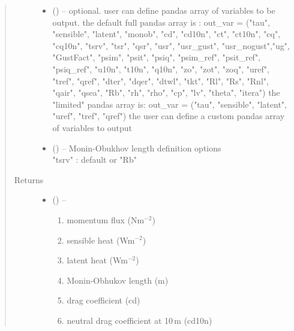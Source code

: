 \documentclass[letterpaper,10pt,english]{sphinxmanual}
\begin{document}
\begin{fulllineitems}
\begin{quote}
\begin{description}
\begin{itemize}
\item {} 
 (\href{https://docs.python.org/3/library/functions.html\#int}{}) -- optional. user can define pandas array of variables to be output.
           the default full pandas array is :
               out\_var = ("tau", "sensible", "latent", "monob", "cd", "cd10n",
                                 "ct", "ct10n", "cq", "cq10n", "tsrv", "tsr", "qsr",
                                 "usr", "usr\_gust", "usr\_nogust","ug", "GustFact",
                                 "psim", "psit", "psiq", "psim\_ref", "psit\_ref",
                                 "psiq\_ref", "u10n", "t10n", "q10n", "zo", "zot", "zoq",
                                 "uref", "tref", "qref", "dter", "dqer", "dtwl", "tkt",
                                 "Rl", "Rs", "Rnl", "qair", "qsea", "Rb", "rh", "rho",
                                 "cp", "lv", "theta", "itera")
            the "limited" pandas array is:
                out\_var = ("tau", "sensible", "latent", "uref", "tref", "qref")
            the user can define a custom pandas array of variables to  output

\item {} 
 (\href{https://docs.python.org/3/library/functions.html\#int}{}) -- Monin-Obukhov length definition options \\
           "tsrv" : default  or  "Rb"  \\
\end{itemize}

\item[{Returns}] \leavevmode
\begin{itemize}
\item {} 
 () --
\begin{enumerate}
\item {} 
momentum flux (Nm$^{-2}$)

\item {} 
sensible heat (Wm$^{-2}$)

\item {} 
latent heat (Wm$^{-2}$)

\item {} 
Monin-Obhukov length (m)

\item {} 
drag coefficient (cd)

\item {} 
neutral drag coefficient at 10\,m (cd10n)


\end{enumerate}
\end{itemize}
\end{description}
\end{quote}
\end{fulllineitems}
\end{document}
